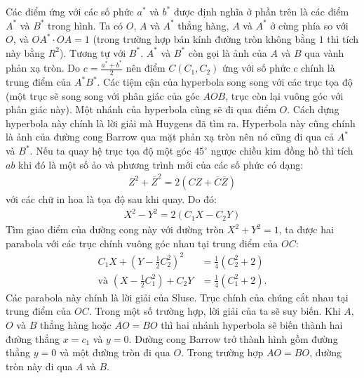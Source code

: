 \begin{multicols}{2}
\begin{figure}[H]
		\vspace*{-10pt}
	\end{figure}
	Các điểm ứng với các số phức $a^*$ và $b^*$ được định nghĩa ở phần trên là các điểm $A^*$ và $B^*$ trong hình. Ta có $O$, $A$ và $A^*$ thẳng hàng, $A$ và $A^*$ ở cùng phía so với $O$, và $OA^*\!\cdot\! OA\!=\!1$ (trong trường hợp bán kính đường tròn không bằng $1$ thì tích này bằng $R^2$). Tương tự với $B^*$. $A^*$ và $B^*$ còn gọi là ảnh của $A$ và $B$ qua vành phản xạ tròn. Do $c=\frac{a^* + b^*}{2}$ nên điểm $C(C_1,C_2)$ ứng với số phức $c$ chính là trung điểm của $A^*B^*$. Các tiệm cận của hyperbola song song với các trục tọa độ (một trục sẽ song song với phân giác của góc $AOB$, trục còn lại vuông góc với phân giác này). Một nhánh của hyperbola cũng sẽ đi qua điểm $O$. Cách dựng hyperbola này chính là lời giải mà Huygens đã tìm ra. Hyperbola này cũng chính là ảnh của đường cong Barrow qua mặt phản xạ tròn nên nó cũng đi qua cả $A^*$ và $B^*$.
	\vskip 0.1cm
	Nếu ta quay hệ trục tọa độ một góc $45^\circ$ ngược chiều kim đồng hồ thì tích $ab$ khi đó là một số ảo và phương trình mới của các số phức có dạng:
	\begin{align*}
		Z^2 + \overline{Z}^2 = 2(CZ + \overline{C}\overline{Z})
	\end{align*}
	với các chữ in hoa là tọa độ sau khi quay.
	\vskip 0.1cm
	Do đó:
	\begin{align*}
		X^2 - Y^2 = 2(C_1X - C_2Y)
	\end{align*}
	Tìm giao điểm của đường cong này với đường tròn $X^2+Y^2=1$, ta được hai parabola với các trục chính vuông góc nhau tại trung điểm của $OC$:
	\begin{align*}
		C_1X + \left(Y- \frac{1}{2}C_2^2\right)^2 &= \frac{1}{4}\left(C_2^2 + 2\right)\\
		\text{và } \left(X- \frac{1}{2}C_1^2\right) + C_2Y &= \frac{1}{4}\left(C_1^2 + 2\right).
	\end{align*}
	Các parabola này chính là lời giải của Sluse. Trục chính của chúng cắt nhau tại trung điểm của $OC$.
	\vskip 0.1cm
	Trong một số trường hợp, lời giải của ta sẽ suy biến.  Khi $A$, $O$ và $B$ thẳng hàng hoặc $AO = BO$ thì hai nhánh hyperbola sẽ biến thành hai đường thẳng $x=c_1$ và $y=0$. Đường cong Barrow trở thành hình gồm đường thẳng $y=0$ và một đường tròn đi qua $O$. Trong trường hợp $AO = BO$, đường tròn này đi qua $A$ và $B$.
	\begin{figure}[H]
		\vspace*{-5pt}
		\centering
		\captionsetup{labelformat= empty, justification=centering}

\end{figure}
\end{multicols}
